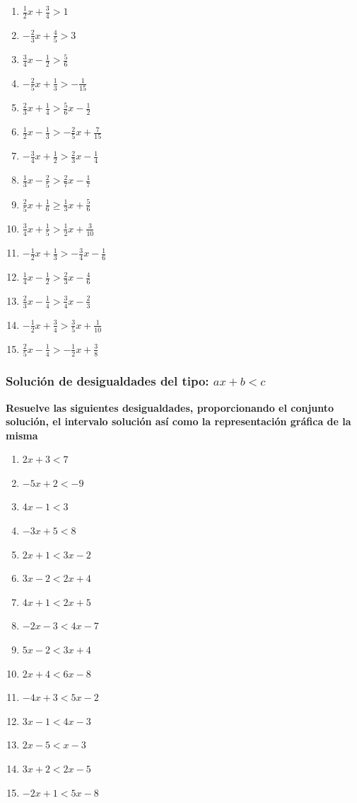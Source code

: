 \documentclass[12pt]{article}
\theoremstyle{plain}
\theoremstyle{definition}
\theoremstyle{remark}
\begin{document}
\begin{enumerate}
\def\labelenumi{\arabic{enumi}.}
\item
  \(\frac{1}{2}x+\frac{3}{4}>1\)
\item
  \(-\frac{2}{3}x+\frac{4}{5}>3\)
\item
  \(\frac{3}{4}x-\frac{1}{2}>\frac{5}{6}\)
\item
  \(-\frac{2}{5}x+\frac{1}{3}>-\frac{1}{15}\)
\item
  \(\frac{2}{3}x+\frac{1}{4}>\frac{5}{6}x-\frac{1}{2}\)
\item
  \(\frac{1}{2}x-\frac{1}{3}>-\frac{2}{5}x+\frac{7}{15}\)
\item
  \(-\frac{3}{4}x+\frac{1}{2}>\frac{2}{3}x-\frac{1}{4}\)
\item
  \(\frac{1}{3}x-\frac{2}{5}>\frac{2}{7}x-\frac{1}{7}\)
\item
  \(\frac{2}{5}x+\frac{1}{6}\geq\frac{1}{3}x+\frac{5}{6}\)
\item
  \(\frac{3}{4}x+\frac{1}{5}>\frac{1}{2}x+\frac{3}{10}\)
\item
  \(-\frac{1}{2}x+\frac{1}{3}>-\frac{3}{4}x-\frac{1}{6}\)
\item
  \(\frac{1}{4}x-\frac{1}{2}>\frac{2}{3}x-\frac{4}{6}\)
\item
  \(\frac{2}{3}x-\frac{1}{4}>\frac{3}{4}x-\frac{2}{3}\)
\item
  \(-\frac{1}{2}x+\frac{3}{4}>\frac{3}{5}x+\frac{1}{10}\)
\item
  \(\frac{2}{5}x-\frac{1}{4}>-\frac{1}{2}x+\frac{3}{8}\)
\end{enumerate}

\subsubsection{\texorpdfstring{Solución de desigualdades del tipo:
\(ax+b<c\)}{Solución de desigualdades del tipo: ax+b\textless c}}\label{soluciuxf3n-de-desigualdades-del-tipo-axbc-1}

\textbf{Resuelve las siguientes desigualdades, proporcionando el
conjunto solución, el intervalo solución así como la representación
gráfica de la misma}

\begin{enumerate}
\def\labelenumi{\arabic{enumi}.}
\item
  \(2x+3<7\)
\item
  \(-5x+2<-9\)
\item
  \(4x-1<3\)
\item
  \(-3x+5<8\)
\item
  \(2x+1<3x-2\)
\item
  \(3x-2<2x+4\)
\item
  \(4x+1<2x+5\)
\item
  \(-2x-3<4x-7\)
\item
  \(5x-2<3x+4\)
\item
  \(2x+4<6x-8\)
\item
  \(-4x+3<5x-2\)
\item
  \(3x-1<4x-3\)
\item
  \(2x-5<x-3\)
\item
  \(3x+2<2x-5\)
\item
  \(-2x+1<5x-8\)
\end{enumerate}
\end{document}
